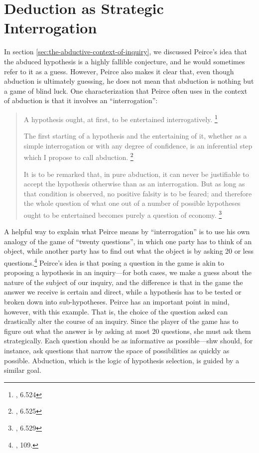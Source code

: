 \section{Deduction as Strategic Interrogation}\label{strategicint}

In section \ref{sec:the-abductive-context-of-inquiry}, we discussed Peirce's idea that the abduced hypothesis is a highly fallible conjecture, and he would sometimes refer to it as a guess. However, Peirce also makes it clear that, even though abduction is ultimately guessing, he does not mean that abduction is nothing but a game of blind luck. One characterization that Peirce often uses in the context of abduction is that it involves an ``interrogation'':

\begin{quote}
	A hypothesis ought, at first, to be entertained interrogatively. \footnote{\cite{CP}, 6.524}
	
	The first starting of a hypothesis and the entertaining of it, whether as a simple interrogation or with any degree of confidence, is an inferential step which I propose to call abduction.	 \footnote{\cite{CP}, 6.525}
	
	It is to be remarked that, in pure abduction, it can never be justifiable to accept the hypothesis otherwise than as an interrogation. But as long as that condition is observed, no positive falsity is to be feared; and therefore the whole question of what one out of a number of possible hypotheses ought to be entertained becomes purely a question of economy.	\footnote{\cite{CP}, 6.529}
\end{quote}

A helpful way to explain what Peirce means by ``interrogation'' is to use his own analogy of the game of ``twenty questions'', in which one party has to think of an object, while another party has to find out what the object is by asking 20 or less questions.\footnote{\cite{essentialpeirce2}, 109.} Peirce's idea is that posing a question in the game is akin to proposing a hypothesis in an inquiry---for both cases, we make a guess about the nature of the subject of our inquiry, and the difference is that in the game the answer we receive is certain and direct, while a hypothesis has to be tested or broken down into sub-hypotheses. Peirce has an important point in mind, however, with this example. That is, the choice of the question asked can drastically alter the course of an inquiry. Since the player of the game has to figure out what the answer is by asking at most 20 questions, she must ask them strategically. Each question should be as informative as possible---shw should, for instance, ask questions that narrow the space of possibilities as quickly as possible. Abduction, which is the logic of hypothesis selection, is guided by a similar goal.


